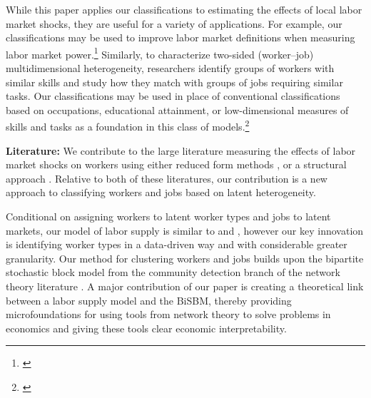 \documentclass[12pt]{article}
\theoremstyle{definition}
\theoremstyle{plain}
\begin{document}
While this paper applies our classifications to estimating the effects of local labor market shocks, they are useful for a variety of applications. For example, our classifications may be used to improve labor market definitions when measuring labor market power.\footnote{\citet{BergerHerkenhoffMongey2022,Felix2021,AzarMarinescuSteinbaumTaska2018,BenmelechBergmanKim2018,Rinz2018,AzarMarinescuSteinbaum2019,SchubertStansburyTaska2020,Arnold2020,Lipsius2018,JaroschNimczikSorkin2019}} Similarly,  to characterize two-sided (worker--job) multidimensional heterogeneity, researchers identify groups of workers with similar skills and study how they match with groups of jobs requiring similar tasks. Our classifications may be used in place of conventional classifications based on occupations, educational attainment, or low-dimensional measures of skills and tasks as a foundation in this class of models.\footnote{\citet{AutorLevyMurnane2003,AcemogluAutor2011,Autor2013,Tan2018,Lindenlaub2017,Kantenga2018}} 



\textbf{Literature:} We contribute to the large literature measuring the effects of labor market shocks on workers using either reduced form methods \citep{AutorDornHanson2013,Card1990,AutorDornHansonSong2014,Yagan2017,BoundHolzer2000,BlanchardKatz1992,Bartik1991}, or a structural approach \citep{BursteinMoralesVogel2019,CaliendoDvorkinParro2019,GalleRodriguezclareYi2017,KimVogel2021}. Relative to both of these literatures, our contribution is a new approach to classifying workers and jobs based on latent heterogeneity.

Conditional on assigning workers to latent worker types and jobs to latent markets, our model of labor supply is similar to \citet{Grigsby2019} and \citet{BonhommeLamadonManresa2019_distributional}, however our key innovation is identifying worker types in a data-driven way and with considerable greater granularity. Our method for clustering workers and jobs builds upon the bipartite stochastic block model from the community detection branch of the network theory literature \citep{LarremoreClausetJacobs2014,Peixoto2019}. A major contribution of our paper is creating a theoretical link between a labor supply model and the BiSBM, thereby providing microfoundations for using tools from network theory to solve problems in economics and giving these tools clear economic interpretability. 
\end{document}

